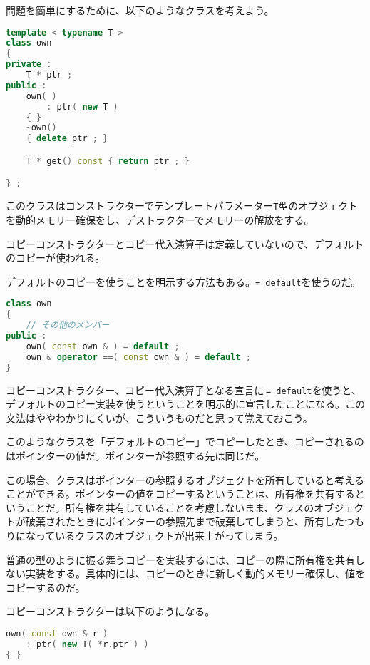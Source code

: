 問題を簡単にするために、以下のようなクラスを考えよう。

\begin{lstlisting}[language={C++}]
template < typename T >
class own
{
private :
    T * ptr ;
public :
    own( )
        : ptr( new T )
    { }
    ~own()
    { delete ptr ; }

    T * get() const { return ptr ; }

} ;
\end{lstlisting}

このクラスはコンストラクターでテンプレートパラメーター\texttt{T}型のオブジェクトを動的メモリー確保をし、デストラクターでメモリーの解放をする。

コピーコンストラクターとコピー代入演算子は定義していないので、デフォルトのコピーが使われる。

デフォルトのコピーを使うことを明示する方法もある。\texttt{= default}を使うのだ。

\begin{lstlisting}[language={C++}]
class own
{
    // その他のメンバー
public :
    own( const own & ) = default ;
    own & operator ==( const own & ) = default ;
}
\end{lstlisting}

コピーコンストラクター、コピー代入演算子となる宣言に\,\texttt{= default}を使うと、デフォルトのコピー実装を使うということを明示的に宣言したことになる。この文法はややわかりにくいが、こういうものだと思って覚えておこう。

このようなクラスを「デフォルトのコピー」でコピーしたとき、コピーされるのはポインターの値だ。ポインターが参照する先は同じだ。

この場合、クラスはポインターの参照するオブジェクトを所有していると考えることができる。ポインターの値をコピーするということは、所有権を共有するということだ。所有権を共有していることを考慮しないまま、クラスのオブジェクトが破棄されたときにポインターの参照先まで破棄してしまうと、所有したつもりになっているクラスのオブジェクトが出来上がってしまう。

普通の型のように振る舞うコピーを実装するには、コピーの際に所有権を共有しない実装をする。具体的には、コピーのときに新しく動的メモリー確保し、値をコピーするのだ。

コピーコンストラクターは以下のようになる。

\begin{lstlisting}[language={C++}]
own( const own & r )
    : ptr( new T( *r.ptr ) )
{ }
\end{lstlisting}

